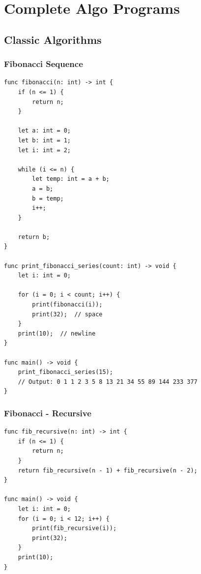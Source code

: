 \documentclass[12pt,a4paper,oneside]{book}
\begin{document}
\chapter{Complete Algo Programs}

\section{Classic Algorithms}

\subsection{Fibonacci Sequence}

\begin{lstlisting}[style=algo, caption={Fibonacci - Iterative}]
func fibonacci(n: int) -> int {
    if (n <= 1) {
        return n;
    }
    
    let a: int = 0;
    let b: int = 1;
    let i: int = 2;
    
    while (i <= n) {
        let temp: int = a + b;
        a = b;
        b = temp;
        i++;
    }
    
    return b;
}

func print_fibonacci_series(count: int) -> void {
    let i: int = 0;
    
    for (i = 0; i < count; i++) {
        print(fibonacci(i));
        print(32);  // space
    }
    print(10);  // newline
}

func main() -> void {
    print_fibonacci_series(15);
    // Output: 0 1 1 2 3 5 8 13 21 34 55 89 144 233 377
}
\end{lstlisting}

\subsection{Fibonacci - Recursive}

\begin{lstlisting}[style=algo, caption={Fibonacci Recursive (Inefficient)}]
func fib_recursive(n: int) -> int {
    if (n <= 1) {
        return n;
    }
    return fib_recursive(n - 1) + fib_recursive(n - 2);
}

func main() -> void {
    let i: int = 0;
    for (i = 0; i < 12; i++) {
        print(fib_recursive(i));
        print(32);
    }
    print(10);
}
\end{lstlisting}
\end{document}
